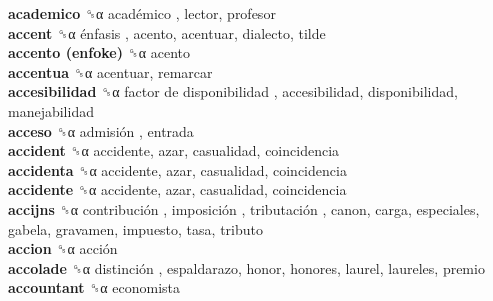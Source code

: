 \textbf{academico} ␝α   académico , lector, profesor  \\
\textbf{accent} ␝α   énfasis , acento, acentuar, dialecto, tilde  \\
\textbf{accento (enfoke)} ␝α  acento  \\
\textbf{accentua} ␝α  acentuar, remarcar  \\
\textbf{accesibilidad} ␝α   factor de disponibilidad , accesibilidad, disponibilidad, manejabilidad  \\
\textbf{acceso} ␝α   admisión , entrada  \\
\textbf{accident} ␝α  accidente, azar, casualidad, coincidencia  \\
\textbf{accidenta} ␝α  accidente, azar, casualidad, coincidencia  \\
\textbf{accidente} ␝α  accidente, azar, casualidad, coincidencia  \\
\textbf{accijns} ␝α   contribución ,  imposición ,  tributación , canon, carga, especiales, gabela, gravamen, impuesto, tasa, tributo  \\
\textbf{accion} ␝α   acción   \\
\textbf{accolade} ␝α   distinción , espaldarazo, honor, honores, laurel, laureles, premio  \\
\textbf{accountant} ␝α  economista  \\
